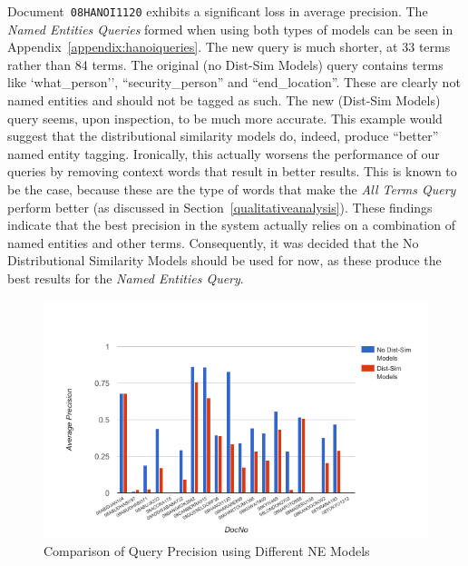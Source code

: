 \documentclass{l4proj}
\newcommand{\code}[1]{\texttt{#1}}
\begin{document}
Document~\code{08HANOI1120} exhibits a significant loss in average precision. The \textit{Named Entities Queries} formed when using both types of models can be seen in Appendix~\ref{appendix:hanoiqueries}.
The new query is much shorter, at 33 terms rather than 84 terms. The original (no Dist-Sim Models) query contains terms like `what\_person'', ``security\_person'' and ``end\_location''. These are clearly not named entities and should not be tagged as such. The new (Dist-Sim Models) query seems, upon inspection, to be much more accurate. This example would suggest that the distributional similarity models do, indeed, produce ``better'' named entity tagging. Ironically, this actually worsens the performance of our queries by removing context words that result in better results. This is known to be the case, because these are the type of words that make the \textit{All Terms Query} perform better (as discussed in Section~\ref{qualitativeanalysis}).
These findings indicate that the best precision in the system actually relies on a combination of named entities and other terms. Consequently, it was decided that the No Distributional Similarity Models should be used for now, as these produce the best results for the \textit{Named Entities Query}.
\begin{figure}[H]
\centering
\includegraphics[scale=0.85]{images/query_by_query}
\caption{Comparison of Query Precision using Different NE Models}
\label{query_by_query}
\end{figure}
\end{document}
